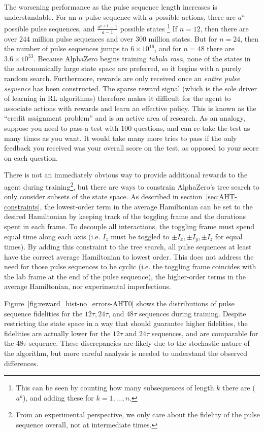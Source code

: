 The worsening performance as the pulse sequence length increases is understandable. For an $n$-pulse sequence with $a$ possible actions, there are $a^n$ possible pulse sequences, and $\frac{a^{n+1} - 1}{a-1}$ possible states%
\footnote{
This can be seen by counting how many subsequences of length $k$ there are ($a^k$), and adding these for $k = 1, \dots, n$.
}
If $n=12$, then there are over $244$ million pulse sequences and over $300$ million states.
But for $n=24$, then the number of pulse sequences jumps to $6 \times 10^{16}$, and for $n=48$ there are $3.6 \times 10^{33}$. Because AlphaZero begins training \emph{tabula rasa}, none of the states in the astronomically large state space are preferred, so it begins with a purely random search.
Furthermore, rewards are only received once an \emph{entire pulse sequence} has been constructed. The sparse reward signal (which is the sole driver of learning in RL algorithms) therefore makes it difficult for the agent to associate actions with rewards and learn an effective policy.
This is known as the ``credit assignment problem'' and is an active area of research.
As an analogy, suppose you need to pass a test with $100$ questions, and can re-take the test as many times as you want. It would take many more tries to pass if the only feedback you received was your overall score on the test, as opposed to your score on each question.

There is not an immediately obvious way to provide additional rewards to the agent during training\footnote{
From an experimental perspective, we only care about the fidelity of the pulse sequence overall, not at intermediate times.
},
but there are ways to constrain AlphaZero's tree search to only consider subsets of the state space.
As described in section~\ref{sec:AHT-constraints}, the lowest-order term in the average Hamiltonian can be set to the desired Hamiltonian by keeping track of the toggling frame and the durations spent in each frame. To decouple all interactions, the toggling frame must spend equal time along each axis (i.e. $I_z$ must be toggled to $\pm I_x, \pm I_y, \pm I_z$ for equal times).
By adding this constraint to the tree search, all pulse sequences at least have the correct average Hamiltonian to lowest order. This does not address the need for those pulse sequences to be cyclic (i.e. the toggling frame coincides with the lab frame at the end of the pulse sequence), the higher-order terms in the average Hamiltonian, nor experimental imperfections.

Figure~\ref{fig:reward_hist-no_errors-AHT0} shows the distributions of pulse sequence fidelities for the $12\tau, 24\tau$, and $48\tau$ sequences during training. Despite restricting the state space in a way that should guarantee higher fidelities, the fidelities are actually lower for the $12\tau$ and $24\tau$ sequences, and are comparable for the $48\tau$ sequence. These discrepancies are likely due to the stochastic nature of the algorithm, but more careful analysis is needed to understand the observed differences.

